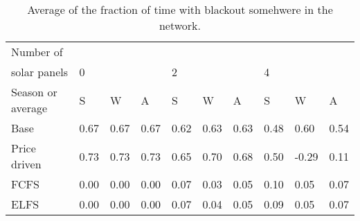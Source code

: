 \begin{table}[h]
\centering
\begin{tabular}{l|lll|lll|lll}Number of \\ solar panels&0& & &2& & &4& & \\ \hline
Season or average & S & W & A & S & W & A & S & W & A \\ \hline
Base&0.67&0.67&0.67&0.62&0.63&0.63&0.48&0.60&0.54 \\
Price driven&0.73&0.73&0.73&0.65&0.70&0.68&0.50&-0.29&0.11 \\
FCFS&0.00&0.00&0.00&0.07&0.03&0.05&0.10&0.05&0.07 \\
ELFS&0.00&0.00&0.00&0.07&0.04&0.05&0.09&0.05&0.07 \\
\end{tabular}
\caption{Average of the fraction of time with blackout somehwere in the network.}
\label{avg blackout}
\end{table}
